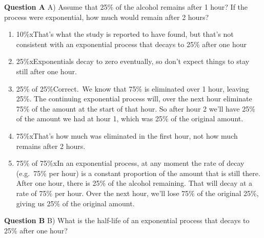 \documentclass[
  letterpaper,
  DIV=11,
  numbers=noendperiod,
  oneside]{article}
\providecommand{\tightlist}{%
  \setlength{\itemsep}{0pt}\setlength{\parskip}{0pt}}\usepackage{longtable,booktabs,array}
\begin{document}
\begin{multicols}{2}
\begin{table}
\begin{minipage}[t]{\linewidth}
{\centering 

\textbf{Question A} A) Assume that 25\% of the alcohol remains after 1
hour? If the process were exponential, how much would remain after 2
hours?

\begin{enumerate}
\def\labelenumi{\roman{enumi}.}
\tightlist
\item
  {10\%{xThat's what the study is reported to have found, but that's
  not consistent with an exponential process that decays to 25\% after
  one hour}}\\
\item
  {25\%{xExponentials decay to zero eventually, so don't expect things
  to stay still after one hour.}}\\
\item
  {25\% of 25\%{Correct.~We know that 75\% is eliminated over 1 hour,
  leaving 25\%. The continuing exponential process will, over the next
  hour eliminate 75\% of the amount at the start of that hour. So after
  hour 2 we'll have 25\% of the amount we had at hour 1, which was 25\%
  of the original amount.}}\\
\item
  {75\%{xThat's how much was eliminated in the first hour, not how
  much remains after 2 hours.}}\\
\item
  {75\% of 75\%{xIn an exponential process, at any moment the rate of
  decay (e.g.~75\% per hour) is a constant proportion of the amount that
  is still there. After one hour, there is 25\% of the alcohol
  remaining. That will decay at a rate of 75\% per hour. Over the next
  hour, we'll lose 75\% of the original 25\%, giving us 25\% of the
  original amount.}}
\end{enumerate}

}

\end{minipage}%
\newline
\begin{minipage}[t]{\linewidth}

{\centering 

\textbf{Question B} B) What is the half-life of an exponential process
that decays to 25\% after one hour?

}
\end{minipage}
\end{table}
\end{multicols}
\end{document}
